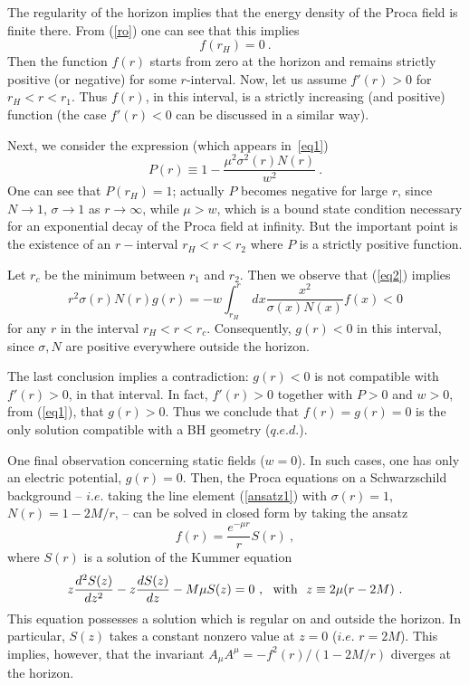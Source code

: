The regularity of the horizon implies that the energy density of the Proca field
is finite there.
From (\ref{ro}) one can see that this implies
 \begin{equation}
f(r_H)=0\ .
\end{equation}
Then the function $f(r)$ starts from zero at the horizon 
and remains strictly positive (or negative) for some $r$-interval.
Now, let us assume $f'(r)>0$ for 
$r_H<r<r_1$. Thus $f(r)$, in this interval, is a strictly increasing (and positive) function 
(the case $f'(r)<0$ can  be discussed in a similar way).

Next, we consider the expression (which appears in~\eqref{eq1}) 
 \begin{equation}
P(r)\equiv 1-\frac{\mu^2\sigma^2(r)N(r) }{w^2}\ .
\end{equation}
One can see that $P(r_H)=1$; actually $P$  
becomes negative for large $r$, since $N\to 1$, $\sigma\to 1$ as $r\to \infty$, while $\mu>w$, which is a bound state condition necessary for an exponential decay of the Proca field at infinity. But the important point is the existence of an $r-$interval
$r_H<r<r_2$ where $P$ is a strictly positive function.


Let $r_c$ be the minimum between $r_1$ and $r_2$.
Then   
  we observe that (\ref{eq2}) implies
\begin{equation}
 r^2\sigma(r)N(r)g(r)  =-w\int_{r_H}^r\ dx \frac{x^2}{\sigma(x)N(x)} f(x)<0 
\label{eq21}
\end{equation} 
for  any $r$ in the interval $r_H<r<r_c$. Consequently, $g(r)<0$ in this interval, since $\sigma,N$ are positive everywhere outside the horizon.

The last conclusion implies a contradiction: $g(r)<0$ is not compatible with $f'(r)>0$, in that interval. In fact, $f'(r)>0$ together with $P>0$ and $w>0$, from (\ref{eq1}), that $g(r)>0$. 
Thus we conclude that $f(r)=g(r)=0$ is the only solution compatible with a BH geometry ($q.e.d.$). 


One final observation concerning static fields ($w=0$). In such cases, one has only an electric potential, $g(r)=0$.
Then, the Proca equations  on a Schwarzschild
background -- $i.e.$ taking the line element (\ref{ansatz1}) 
with $\sigma(r)=1$, $N(r)=1-2M/r$, --
can be solved in closed form by taking the ansatz~\cite{Gottlieb:1984jg}
\begin{equation}
f(r)=\frac{e^{-\mu r}}{r}S(r) \ ,
\label{eqs1}
\end{equation} 
where $S(r)$ is a solution of the Kummer equation~\cite{Abramowitz} 
\begin{equation}
z\frac{d^2 S(z)}{dz^2}-z \frac{d S(z)}{dz}-M \mu S(z)=0\ ,~~{\rm with}~~z\equiv 2\mu(r-2M) \ .
\label{eqs2}
\end{equation} 
This equation possesses a solution which is regular on and outside the  horizon.
In particular, $S(z)$ takes a constant nonzero value at $z=0$ ($i.e.$ $r=2M$).
This implies, however, that the invariant $A_\mu A^\mu=-f^2(r)/(1-2M/r)$
diverges at the horizon.



